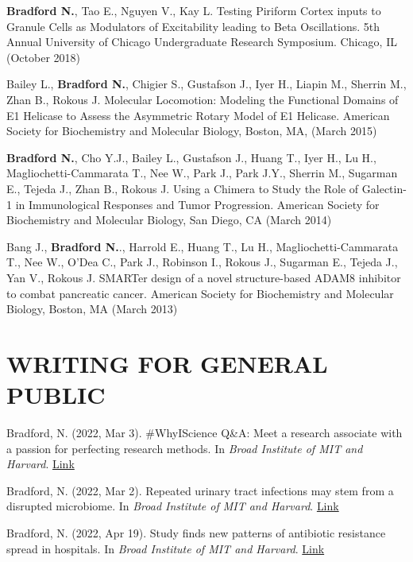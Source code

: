 \documentclass[margin, 10pt]{res} %
\begin{document}
\begin{resume}
\textbf{Bradford N.}, Tao E., Nguyen V., Kay L. Testing Piriform Cortex inputs to Granule Cells as Modulators of Excitability leading to Beta Oscillations. 5th Annual University of Chicago Undergraduate Research Symposium. Chicago, IL (October 2018)


Bailey L., \textbf{Bradford N.}, Chigier S., Gustafson J., Iyer H., Liapin M., Sherrin M., Zhan B., Rokous J. Molecular Locomotion: Modeling the Functional Domains of E1 Helicase to Assess the Asymmetric Rotary Model of E1 Helicase. American Society for Biochemistry and Molecular Biology, Boston, MA, (March 2015)

\textbf{Bradford N.}, Cho Y.J., Bailey L., Gustafson J., Huang T., Iyer H., Lu H., Magliochetti-Cammarata T., Nee W., Park J., Park J.Y., Sherrin M., Sugarman E., Tejeda J., Zhan B., Rokous J. Using a Chimera to Study the Role of Galectin-1 in Immunological Responses and Tumor Progression. American Society for Biochemistry and Molecular Biology, San Diego, CA (March 2014)

Bang J., \textbf{Bradford N.}., Harrold E., Huang T., Lu H., Magliochetti-Cammarata T., Nee W., O'Dea C., Park J., Robinson I., Rokous J., Sugarman E., Tejeda J., Yan V., Rokous J. SMARTer design of a novel structure-based ADAM8 inhibitor to combat pancreatic cancer. American Society for Biochemistry and Molecular Biology, Boston, MA (March 2013)


\section{WRITING FOR GENERAL PUBLIC}
Bradford, N. (2022, Mar 3). \#WhyIScience Q\&A: Meet a research associate with a passion for perfecting research methods. In {\sl Broad Institute of MIT and Harvard}. \href{https://www.broadinstitute.org/blog/whyiscience-qa-meet-research-associate-passion-perfecting-research-methods}{Link}

Bradford, N. (2022, Mar 2). Repeated urinary tract infections may stem from a disrupted microbiome. In {\sl Broad Institute of MIT and Harvard}. \href{https://www.broadinstitute.org/news/repeated-urinary-tract-infections-may-stem-disrupted-microbiome}{Link}


Bradford, N. (2022, Apr 19). Study finds new patterns of antibiotic resistance spread in hospitals. In {\sl Broad Institute of MIT and Harvard}. \href{https://www.broadinstitute.org/news/study-finds-new-patterns-antibiotic-resistance-spread-hospitals}{Link}


\end{resume}
\end{document}
